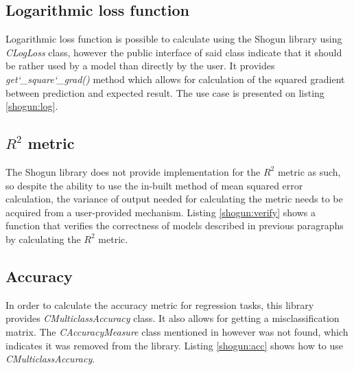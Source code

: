 
\subsection{Logarithmic loss function}

Logarithmic loss function is possible to calculate using the Shogun library using \textit{CLogLoss} class, however the public interface of said class indicate that it should be rather used by a model than directly by the user. It provides \textit{get\char`_square\char`_grad()} method which allows for calculation of the squared gradient between prediction and expected result. The use case is presented on listing \ref{shogun:log}.


\subsection{$R^2$ metric}

The Shogun library does not provide implementation for the $R^2$ metric as such, so despite the ability to use the in-built method of mean squared error calculation, the variance of output needed for calculating the metric needs to be acquired from a user-provided mechanism. Listing \ref{shogun:verify} shows a function that verifies the correctness of models described in previous paragraphs by calculating the $R^2$ metric.


\subsection{Accuracy}

In order to calculate the accuracy metric for regression tasks, this library provides \textit{CMulticlassAccuracy} class. It also allows for getting a misclassification matrix. The \textit{CAccuracyMeasure} class mentioned in \cite{handsOnMachineLearning} however was not found, which indicates it was removed from the library. Listing \ref{shogun:acc} shows how to use \textit{CMulticlassAccuracy}.



